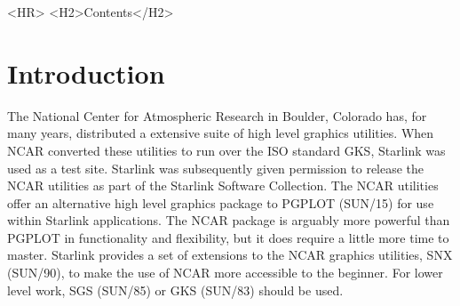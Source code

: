 \documentclass[twoside,11pt]{article}
\newcommand{\stardocinitials}  {SUN}
\newcommand{\stardocnumber}    {88.6}
\newcommand{\stardocname}{\stardocinitials /\stardocnumber}
\newcommand{\htmladdimg}[1]{}
\newcommand{\htmlref}[2]{#1}
\newcommand{\htmladdtonavigation}[1]{}
\newenvironment{latexonly}{}{}
\newcommand{\xref}[3]{#1}
\newcommand{\xlabel}[1]{}
\renewcommand{\_}{\texttt{\symbol{95}}}
\renewcommand{\thepage}{\roman{page}}
\begin{document}
\begin{htmlonly}
  \label{stardoccontents}
  \begin{rawhtml} 
    <HR>
    <H2>Contents</H2>
  \end{rawhtml}
  \htmladdtonavigation{\htmlref{\htmladdimg{contents_motif.gif}}
        {stardoccontents}}

\end{htmlonly}

  \newpage
  \begin{latexonly}
    \setlength{\parskip}{0mm}
    \tableofcontents
    \setlength{\parskip}{\medskipamount}
    \markboth{\stardocname}{\stardocname}
  \end{latexonly}
\cleardoublepage
\renewcommand{\thepage}{\arabic{page}}
\setcounter{page}{1}


\section{\xlabel{introduction}Introduction}

The National Center for Atmospheric Research in Boulder, Colorado has,
for many years, distributed a extensive suite of high level graphics
utilities.  When NCAR converted these utilities to run over the ISO
standard GKS, Starlink was used as a test site.  Starlink was
subsequently given permission to release the NCAR utilities as part of
the Starlink Software Collection.  The NCAR utilities offer an
alternative high level graphics package to PGPLOT (\xref{SUN/15}{sun15}{}) 
for use
within Starlink applications.  The NCAR package is arguably more
powerful than PGPLOT in functionality and flexibility, but it does
require a little more time to master.  Starlink provides a set of
extensions to the NCAR graphics utilities, SNX (\xref{SUN/90}{sun90}{}), to make the
use of NCAR more accessible to the beginner.  For lower level work, SGS
(\xref{SUN/85}{sun85}{}) or GKS (\xref{SUN/83}{sun83}{}) should be used.
\end{document}
